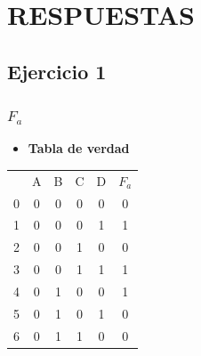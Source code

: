 \section{RESPUESTAS}
\subsection{Ejercicio 1}
\subsubsection{$F_a$}
\begin{itemize}[nosep] \item \textbf{Tabla de verdad} \end{itemize}
\begin{center}
    \begin{minipage}[t]{0.3\textwidth}\centering
\begin{tabular}{cccccc}
\rowcolor[HTML]{FFFFC7} 
\multicolumn{6}{c}{\cellcolor[HTML]{FFFFC7}$F_a(ABCD)$}                                                                                       \\ \hline
\rowcolor[HTML]{ECF4FF} 
\multicolumn{1}{c|}{\cellcolor[HTML]{9AFF99}$m$} & A & B & C & \multicolumn{1}{c|}{\cellcolor[HTML]{ECF4FF}D} & \cellcolor[HTML]{FFCCC9}$F_a$ \\ \hline
\multicolumn{1}{c|}{0}                           & 0 & 0 & 0 & \multicolumn{1}{c|}{0}                         & 0                             \\
\multicolumn{1}{c|}{1}                           & 0 & 0 & 0 & \multicolumn{1}{c|}{1}                         & 1                             \\
\multicolumn{1}{c|}{2}                           & 0 & 0 & 1 & \multicolumn{1}{c|}{0}                         & 0                             \\
\multicolumn{1}{c|}{3}                           & 0 & 0 & 1 & \multicolumn{1}{c|}{1}                         & 1                             \\
\multicolumn{1}{c|}{4}                           & 0 & 1 & 0 & \multicolumn{1}{c|}{0}                         & 1                             \\
\multicolumn{1}{c|}{5}                           & 0 & 1 & 0 & \multicolumn{1}{c|}{1}                         & 0                             \\
\multicolumn{1}{c|}{6}                           & 0 & 1 & 1 & \multicolumn{1}{c|}{0}                         & 0                             \\

\end{tabular}
\end{minipage}
\end{center}
